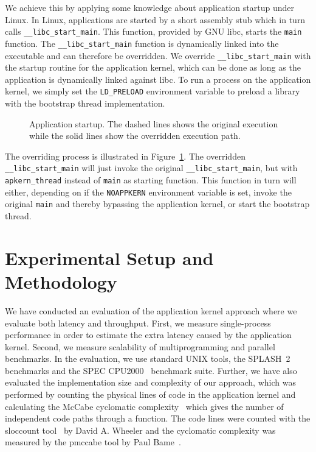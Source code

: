 We achieve this by applying some knowledge about application startup under
Linux. In Linux, applications are started by a short assembly stub which in
turn calls \texttt{\_\_libc\_start\_main}. This function, provided by GNU
libc, starts the \texttt{main} function.  The \texttt{\_\_libc\_start\_main}
function is dynamically linked into the executable and can therefore be
overridden. We override \texttt{\_\_libc\_start\_main} with the startup
routine for the application kernel, which can be done as long as the
application is dynamically linked against libc. To run a process on the
application kernel, we simply set the \texttt{LD\_PRELOAD} environment
variable to preload a library with the bootstrap thread implementation.

\begin{figure}
  \begin{center}
  \end{center}
  \caption[Application startup]{Application startup. The dashed lines shows the original execution
    while the solid lines show the overridden execution path.}
  \label{fig:start_main_override}
\end{figure}

The overriding process is illustrated in Figure~\ref{fig:start_main_override}.
The overridden \texttt{\_\_libc\_start\_main} will just invoke the original
\texttt{\_\_libc\_start\_main}, but with \texttt{apkern\_thread} instead of
\texttt{main} as starting function. This function in turn will either,
depending on if the \texttt{NOAPPKERN} environment variable is set, invoke the
original \texttt{main} and thereby bypassing the application kernel, or start
the bootstrap thread.


\section{Experimental Setup and Methodology}
\label{sec:appkern:evaluation_framework}
We have conducted an evaluation of the application kernel approach where we
evaluate both latency and throughput. First, we measure single-process
performance in order to estimate the extra latency caused by the application
kernel. Second, we measure scalability of multiprogramming and parallel
benchmarks. In the evaluation, we use standard UNIX tools, the
SPLASH~2~\cite{cameron95splash} benchmarks and the SPEC
CPU2000~\cite{spec2000} benchmark suite. Further, we have also evaluated the
implementation size and complexity of our approach, which was performed by
counting the physical lines of code in the application kernel and calculating
the McCabe cyclomatic complexity~\cite{fenton98swmetrics} which gives the
number of independent code paths through a function. The code lines were counted
with the sloccount tool~\cite{sloccount} by David A. Wheeler and the cyclomatic
complexity was measured by the pmccabe tool by Paul Bame~\cite{pmccabe}.

